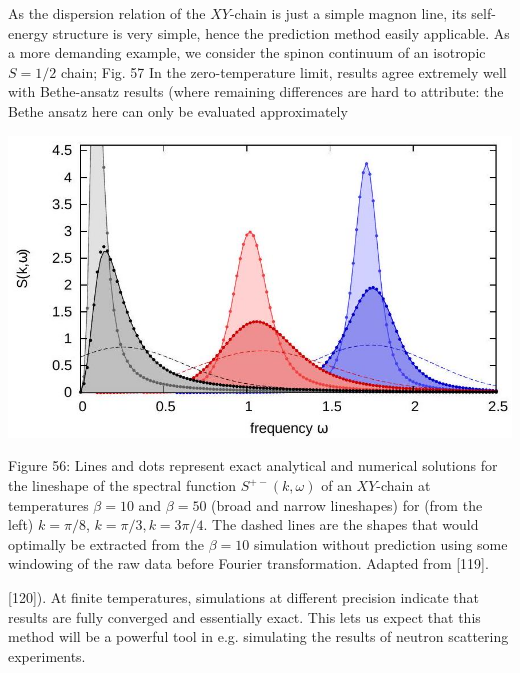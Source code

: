 \documentclass[12pt]{article}
\begin{document}
As the dispersion relation of the $X Y$-chain is just a simple magnon line, its self-energy structure is very simple, hence the prediction method easily applicable. As a more demanding example, we consider the spinon continuum of an isotropic $S=1 / 2$ chain; Fig. 57 In the zero-temperature limit, results agree extremely well with Bethe-ansatz results (where remaining differences are hard to attribute: the Bethe ansatz here can only be evaluated approximately

\begin{center}
\includegraphics[max width=\textwidth]{2024_05_04_afc4ad226da9ccfe0ac8g-096}
\end{center}

Figure 56: Lines and dots represent exact analytical and numerical solutions for the lineshape of the spectral function $S^{+-}(k, \omega)$ of an $X Y$-chain at temperatures $\beta=10$ and $\beta=50$ (broad and narrow lineshapes) for (from the left) $k=\pi / 8$, $k=\pi / 3, k=3 \pi / 4$. The dashed lines are the shapes that would optimally be extracted from the $\beta=10$ simulation without prediction using some windowing of the raw data before Fourier transformation. Adapted from [119].

[120]). At finite temperatures, simulations at different precision indicate that results are fully converged and essentially exact. This lets us expect that this method will be a powerful tool in e.g. simulating the results of neutron scattering experiments.
\end{document}
